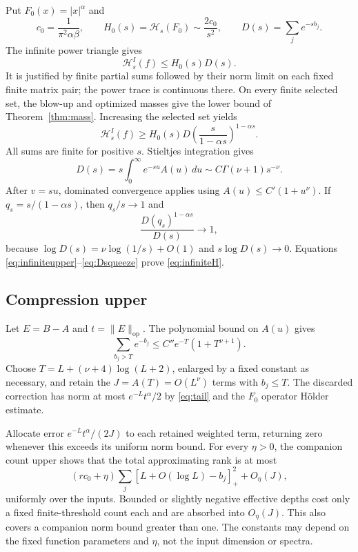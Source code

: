 \documentclass[11pt]{article}
\numberwithin{equation}{section}
\newcommand{\op}{\mathrm{op}}
\newcommand{\cH}{\mathcal H}
\begin{document}
Put $F_0(x)=|x|^\alpha$ and
\[
 c_0=\frac1{\pi^2\alpha\beta},\qquad
 H_0(s)=\cH_s(F_0)\sim\frac{2c_0}{s^2},\qquad
 D(s)=\sum_j e^{-s b_j}.
\]
The infinite power triangle gives
\begin{equation}\label{eq:infiniteupper}
 \cH_s^I(f)\le H_0(s)D(s).
\end{equation}
It is justified by finite partial sums followed by their norm limit
on each fixed finite matrix pair; the power trace is continuous there.
On every finite selected set, the blow-up and optimized masses give
the lower bound of Theorem~\ref{thm:mass}. Increasing the selected set
yields
\begin{equation}\label{eq:infinitelower}
 \cH_s^I(f)\ge
 H_0(s)D\left(\frac{s}{1-\alpha s}\right)^{1-\alpha s}.
\end{equation}
All sums are finite for positive $s$. Stieltjes integration gives
\begin{equation}\label{eq:D}
 D(s)=s\int_0^\infty e^{-su}A(u)\,du
                  \sim C\Gamma(\nu+1)s^{-\nu}.
\end{equation}
After $v=su$, dominated convergence applies using
$A(u)\le C'(1+u^\nu)$. If $q_s=s/(1-\alpha s)$, then $q_s/s\to1$ and
\begin{equation}\label{eq:Dsqueeze}
 \frac{D(q_s)^{1-\alpha s}}{D(s)}\longrightarrow1,
\end{equation}
because $\log D(s)=\nu\log(1/s)+O(1)$ and
$s\log D(s)\to0$. Equations
\eqref{eq:infiniteupper}--\eqref{eq:Dsqueeze} prove
\eqref{eq:infiniteH}.

\subsection{Compression upper}

Let $E=B-A$ and $t=\|E\|_{\op}$.
The polynomial bound on $A(u)$ gives
\begin{equation}\label{eq:tail}
 \sum_{b_j>T}e^{-b_j}\le C''e^{-T}(1+T^{\nu+1}).
\end{equation}
Choose
$T=L+(\nu+4)\log(L+2)$, enlarged by a fixed constant as necessary,
and retain the $J=A(T)=O(L^\nu)$ terms with $b_j\le T$.
The discarded correction has norm at most $e^{-L}t^\alpha/2$ by
\eqref{eq:tail} and the $F_0$ operator H\"older estimate.

Allocate error $e^{-L}t^\alpha/(2J)$ to each retained weighted term,
returning zero whenever this exceeds its uniform norm bound.
For every $\eta>0$, the companion count upper shows that the total
approximating rank is at most
\begin{equation}\label{eq:sumrank}
 (rc_0+\eta)\sum_j[L+O(\log L)-b_j]_+^2+O_\eta(J),
\end{equation}
uniformly over the inputs. Bounded or slightly negative effective
depths cost only a fixed finite-threshold count each and are absorbed
into $O_\eta(J)$. This also covers a companion norm bound greater than
one. The constants may depend on the fixed function parameters and
$\eta$, not the input dimension or spectra.
\end{document}
